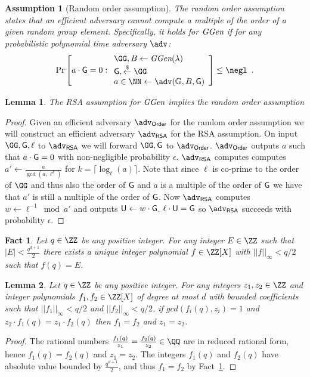 \documentclass[12pt]{article}
\theoremstyle{Definition}
\newtheorem{lemma}{Lemma}
\newtheorem{assumption}{Assumption}
\newtheorem{fact}{Fact}
\begin{document}
\begin{assumption}[Random order assumption]
	The random order assumption states that an efficient adversary cannot compute a multiple of the order of a given random group element. Specifically, it holds for $\textit{GGen}$ if for any probabilistic polynomial time adversary $\adv$:
	\[
    \Pr\left[a\cdot \Generator =0:
    \begin{array}{l}
         \GG,B \leftarrow \ggen(\lambda)  \\
         \Generator, \sample \GG\\
         a \in \NN \leftarrow \adv(\mathbb{G},B, \Generator) \\
    \end{array}\right] \leq \negl \enspace .
    \]
\end{assumption}
\begin{lemma}
\label{lem:roa-to-rsa}
	The RSA assumption for $\textit{GGen}$ implies the random order assumption
	\end{lemma}
\begin{proof}
	Given an efficient adversary $\adv_{\textsf{Order}}$ for the random order assumption we will construct an efficient adversary $\adv_{\textsf{RSA}}$ for the RSA assumption. On input $\GG,\Generator,\ell$ to $\adv_{\textsf{RSA}}$ we will forward $\GG,\Generator$ to $\adv_{\textsf{Order}}$. $\adv_{\textsf{Order}}$ outputs $a$ such that $a\cdot \mathsf{G}=0$ with non-negligible probability $\epsilon$. 
	$\adv_{\textsf{RSA}}$ computes computes $a'\gets \frac{a}{\gcd(a,\ell^k)}$ for $k=\lceil\log_\ell(a)\rceil$. Note that since $\ell$ is co-prime to the order of $\GG$ and thus also the order of $\mathsf{G}$ and $a$ is a multiple of the order of $\mathsf{G}$ we have that $a'$ is still a multiple of the order of $\mathsf{G}$. Now $\adv_{\textsf{RSA}}$ computes $w\gets \ell^{-1} \bmod a'$ and outputs $\mathsf{U} \gets w\cdot \mathsf{G}$. $\ell \cdot \mathsf{U}=\mathsf{G}$ so $\adv_{\textsf{RSA}}$ succeeds with probability $\epsilon$.
\end{proof}

\begin{fact}
\label{fact:encoding}
Let $q \in \ZZ$ be any positive integer. For any integer $E \in \ZZ$ such that $|E|<\frac{q^{d+1}}{2}$ there exists a unique integer polynomial $f \in \ZZ[X]$ with $||f||_\infty < q/2$ such that $f(q) = E$. 
\end{fact} 

\begin{lemma}
\label{lem:encoding}
Let $q \in \Z$ be any positive integer. For any integers $z_1, z_2 \in \ZZ$ and integer polynomials $f_1, f_2 \in \ZZ[X]$ of degree at most $d$ with bounded coefficients such that $||f_1||_\infty < q/2$ and $||f_2||_\infty < q/2$, if $gcd(f_i(q), z_i) = 1$ and $z_2 \cdot f_1(q) = z_1 \cdot f_2(q)$ then 
$f_1 = f_2$ and $z_1 = z_2$. 
\end{lemma}
\begin{proof}
The rational numbers $\frac{f_1(q)}{z_1} = \frac{f_2(q)}{z_2} \in \QQ$ are in reduced rational form, hence $f_1(q) = f_2(q)$ and $z_1 = z_2$. The integers $f_1(q)$ and $f_2(q)$ have absolute value bounded by $\frac{q^{d+1}}{2}$, and thus $f_1 = f_2$ by Fact~\ref{fact:encoding}.
\end{proof}
\end{document}
